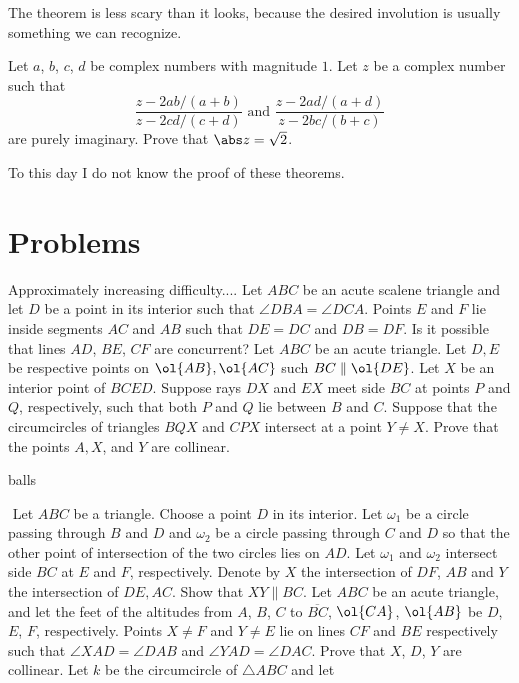 \documentclass{seto}
\begin{document}
The theorem is less scary than it looks, because the desired involution
is usually something we can recognize.
\begin{block}
Let $a$, $b$, $c$, $d$ be complex numbers with magnitude $1$.
Let $z$ be a complex number such that 
\[\frac{z-2ab/(a+b)}{z-2cd/(c+d)}\text{ and } \frac{z-2ad/(a+d)}{z-2bc/(b+c)}\]
are purely imaginary. Prove that $\abs z=\sqrt 2$.
\end{block}
\begin{remark} To this day I do not know the proof of these theorems.\end{remark}
\section{Problems}
Approximately increasing difficulty....
\exercise[MPO 2024/1] Let $ABC$ be an acute scalene triangle 
and let $D$ be a point in its 
interior such that $\angle DBA = \angle DCA$. 
Points $E$ and $F$ lie inside segments $AC$ and $AB$ such that
$DE = DC$ and $DB = DF$. 
Is it possible that lines $AD$, $BE$, $CF$ are concurrent?
\exercise[APMO 2024/1] Let $ABC$ be an acute triangle. Let $D,E$ be respective
points on $\ol{AB},\ol{AC}$ such $BC\parallel\ol{DE}$.
Let $X$ be an interior point of $BCED$. Suppose rays $DX$ and $EX$
meet side $BC$ at points $P$ and $Q$, respectively, such that both $P$ and $Q$
lie between $B$ and $C$. Suppose that the circumcircles of triangles $BQX$ and
$CPX$ intersect at a point $Y \neq X$. Prove that the points $A, X$, and $Y$ are
collinear.
\begin{remark} balls\end{remark} $ $
 Let $ABC$ be a triangle. Choose a point $D$ in its
interior. Let $\omega_1$ be a circle passing through $B$ and $D$ and $\omega_2$
be a circle passing through $C$ and $D$ so that the other point of intersection
of the two circles lies on $AD$. Let $\omega_1$ and $\omega_2$ intersect side
$BC$ at $E$ and $F$, respectively. Denote by $X$ the intersection of $DF$, $AB$
and $Y$ the intersection of $DE, AC$. Show that $XY \parallel BC$.
\exercise[CJMO 2021/1] Let $ABC$ be an acute triangle, and let the feet of the
altitudes from $A$, $B$, $C$ to $\overline{BC}$, $\ol{CA}$, $\ol{AB}$ be $D$,
$E$, $F$, respectively. Points $X\neq F$ and $Y\neq E$ lie on lines $CF$ and
$BE$ respectively such that $\angle XAD = \angle DAB$ and $\angle YAD = \angle
DAC$. Prove that $X$, $D$, $Y$ are collinear.
\exercise[Serbia 2017/6] Let $k$ be the circumcircle of $\triangle ABC$ and let
\end{document}
